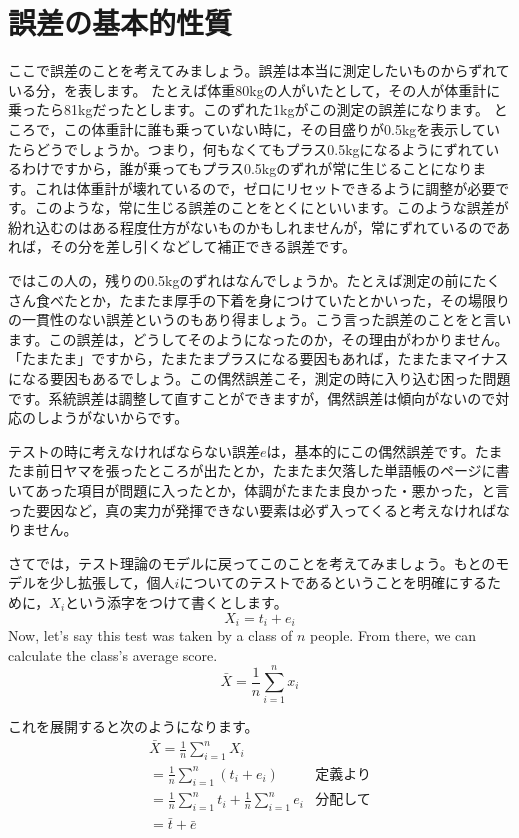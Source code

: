 \documentclass{ltjbook}
\begin{document}
\section{誤差の基本的性質}
ここで誤差のことを考えてみましょう。誤差は本当に測定したいものからずれている分，を表します。
たとえば体重80kgの人がいたとして，その人が体重計に乗ったら81kgだったとします。このずれた1kgがこの測定の誤差になります。
ところで，この体重計に誰も乗っていない時に，その目盛りが0.5kgを表示していたらどうでしょうか。つまり，何もなくてもプラス0.5kgになるようにずれているわけですから，誰が乗ってもプラス0.5kgのずれが常に生じることになります。これは体重計が壊れているので，ゼロにリセットできるように調整が必要です。このような，常に生じる誤差のことをとくにといいます。このような誤差が紛れ込むのはある程度仕方がないものかもしれませんが，常にずれているのであれば，その分を差し引くなどして補正できる誤差です。

ではこの人の，残りの0.5kgのずれはなんでしょうか。たとえば測定の前にたくさん食べたとか，たまたま厚手の下着を身につけていたとかいった，その場限りの一貫性のない誤差というのもあり得ましょう。こう言った誤差のことをと言います。この誤差は，どうしてそのようになったのか，その理由がわかりません。「たまたま」ですから，たまたまプラスになる要因もあれば，たまたまマイナスになる要因もあるでしょう。この偶然誤差こそ，測定の時に入り込む困った問題です。系統誤差は調整して直すことができますが，偶然誤差は傾向がないので対応のしようがないからです。

テストの時に考えなければならない誤差$e$は，基本的にこの偶然誤差です。たまたま前日ヤマを張ったところが出たとか，たまたま欠落した単語帳のページに書いてあった項目が問題に入ったとか，体調がたまたま良かった・悪かった，と言った要因など，真の実力が発揮できない要素は必ず入ってくると考えなければなりません。

さてでは，テスト理論のモデルに戻ってこのことを考えてみましょう。もとのモデルを少し拡張して，個人$i$についてのテストであるということを明確にするために，$X_i$という添字をつけて書くとします。
\[ X_i = t_i + e_i \]
Now, let's say this test was taken by a class of $n$ people. From there, we can calculate the class's average score.
\[ \bar{X} = \frac{1}{n}\sum_{i=1}^n x_i \]

これを展開すると次のようになります。
\begin{align*}
	 & \bar{X}  =  \frac{1}{n}\sum_{i=1}^n X_i                         &             & \mbox{} \\
	 & =  \frac{1}{n}\sum_{i=1}^n (t_i + e_i)                          & \mbox{定義より}           \\
	 & =  \frac{1}{n} \sum_{i=1}^n  t_i + \frac{1}{n}\sum_{i=1}^n  e_i & \mbox{分配して}           \\
	 & =  \bar{t} + \bar{e}                                            & \mbox{}               \\
\end{align*}
\end{document}
